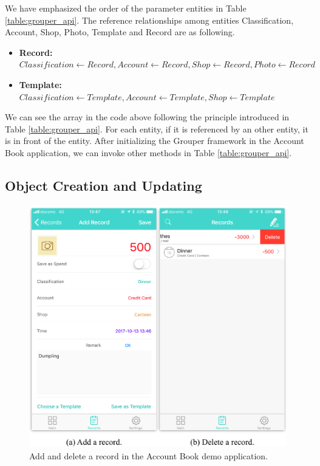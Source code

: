 \documentclass[a4paper,11pt]{report}
\begin{document}
We have emphasized the order of the parameter entities in Table \ref{table:grouper_api}.
The reference relationships among entities Classification, Account, Shop, Photo, Template and Record are as following.

\begin{itemize}[leftmargin=7mm]
	\setlength{\itemsep}{1pt}
	\setlength{\parskip}{0pt}
	\setlength{\parsep}{0pt}
	\item \textbf{Record:}
	$Classification \gets Record, Account \gets Record, Shop \gets Record, Photo \gets Record$
	\item \textbf{Template:} 
	$Classification \gets Template, Account \gets Template, Shop \gets Template$
\end{itemize}

We can see the array in the code above following the principle introduced in Table \ref{table:grouper_api}.
For each entity, if it is referenced by an other entity, it is in front of the entity.
After initializing the Grouper framework in the Account Book application, we can invoke other methods in Table \ref{table:grouper_api}.

\subsection{Object Creation and Updating}

\begin{figure}[t]
	\centering
	\includegraphics[scale=0.8]{account_book}
	\caption{Add and delete a record in the Account Book demo application.}
	\label{fig:add_delete_record}
\end{figure}
\end{document}
